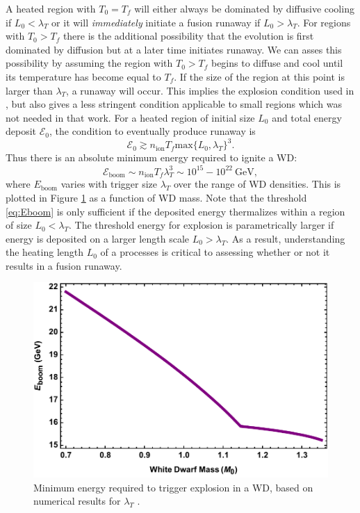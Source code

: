 \documentclass[twocolumn,showpacs,preprintnumbers,amsmath,amssymb,prd]{revtex4}
\newcommand{\Ez}{\mathcal{E}_0}
\newcommand{\GeV}{\text{GeV}}
\begin{document}
A heated region with $T_0=T_f$ will either always be dominated by diffusive cooling if $L_0 < \lambda_T$ or it will \emph{immediately} initiate a fusion runaway if $L_0 > \lambda_T$.  
For regions with $T_0 > T_f$ there is the additional possibility that the evolution is first dominated by diffusion but at a later time initiates runaway.
We can asses this possibility by assuming the region with $T_0 > T_f$ begins to diffuse and cool until its temperature has become equal to $T_f$.
If the size of the region at this point is larger than $\lambda_T$, a runaway will occur.  
This implies the explosion condition used in \cite{Graham:2015apa}, but also gives a less stringent condition applicable to small regions which was not needed in that work.  
For a heated region of initial size $L_0$ and total energy deposit $\Ez$, the condition to eventually produce runaway is
\begin{equation}
\label{eq:boom}
  \Ez \gtrsim n_\text{ion} T_f \text{max}\{L_0, \lambda_T\}^3.
\end{equation}
Thus there is an absolute minimum energy required to ignite a WD:
\begin{equation}
\label{eq:Eboom}
\mathcal{E}_{\text{boom}} \sim n_\text{ion} T_f \lambda_T^3 \sim 10^{15} - 10^{22} ~\GeV,
\end{equation}
where $E_\text{boom}$ varies with trigger size $\lambda_T$ over the range of WD densities.
This is plotted in Figure \ref{fig:Eboom} as a function of WD mass.
Note that the threshold \eqref{eq:Eboom} is only sufficient if the deposited energy thermalizes within a region of size $L_0 < \lambda_T$.
The threshold energy for explosion is parametrically larger if energy is deposited on a larger length scale $L_0 > \lambda_T$.
As a result, understanding the heating length $L_0$ of a processes is critical to assessing whether or not it results in a fusion runaway.

\begin{figure}
\includegraphics[scale=.45]{Eboom.pdf}
\caption{Minimum energy required to trigger explosion in a WD, based on numerical results for $\lambda_T$ \cite{Woosley}.}
\label{fig:Eboom}
\end{figure}
\end{document}

